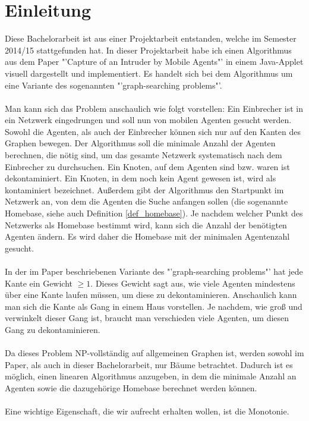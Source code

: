 \section{Einleitung}
Diese Bachelorarbeit ist aus einer Projektarbeit entstanden, welche im Semester 2014/15 stattgefunden hat.
In dieser Projektarbeit habe ich einen Algorithmus aus dem Paper "'Capture of an Intruder by Mobile Agents"' \cite{cima_paper} in einem Java-Applet visuell dargestellt und implementiert. Es handelt sich bei dem Algorithmus um eine Variante des sogenannten "'graph-searching problems"'.
\\
\\
Man kann sich das Problem anschaulich wie folgt vorstellen: Ein Einbrecher ist in ein Netzwerk eingedrungen und soll nun von mobilen Agenten gesucht werden. Sowohl die Agenten, als auch der Einbrecher können sich nur auf den Kanten des Graphen bewegen. Der Algorithmus soll die minimale Anzahl der Agenten berechnen, die nötig sind, um das gesamte Netzwerk systematisch nach dem Einbrecher zu durchsuchen. Ein Knoten, auf dem Agenten sind bzw. waren ist dekontaminiert. Ein Knoten, in dem noch kein Agent gewesen ist, wird als kontaminiert bezeichnet. Außerdem gibt der Algorithmus den Startpunkt im Netzwerk an, von dem die Agenten die Suche anfangen sollen (die sogenannte Homebase, siehe auch Definition \ref{def_homebase}). Je nachdem welcher Punkt des Netzwerks als Homebase bestimmt wird, kann sich die Anzahl der benötigten Agenten ändern. Es wird daher die Homebase mit der minimalen Agentenzahl gesucht.
\\
\\
In der im Paper beschriebenen Variante des "'graph-searching problems"' hat jede Kante ein Gewicht $\geq 1$. Dieses Gewicht sagt aus, wie viele Agenten mindestens über eine Kante laufen müssen, um diese zu dekontaminieren. Anschaulich kann man sich die Kante als Gang in einem Haus vorstellen. Je nachdem, wie groß und verwinkelt dieser Gang ist, braucht man verschieden viele Agenten, um diesen Gang zu dekontaminieren.
\\
\\
Da dieses Problem NP-vollständig auf allgemeinen Graphen ist, werden sowohl im Paper, als auch in dieser Bachelorarbeit, nur Bäume betrachtet. Dadurch ist es möglich, einen linearen Algorithmus anzugeben, in dem die minimale Anzahl an Agenten sowie die dazugehörige Homebase berechnet werden können.
\\
\\
Eine wichtige Eigenschaft, die wir aufrecht erhalten wollen, ist die Monotonie. 
